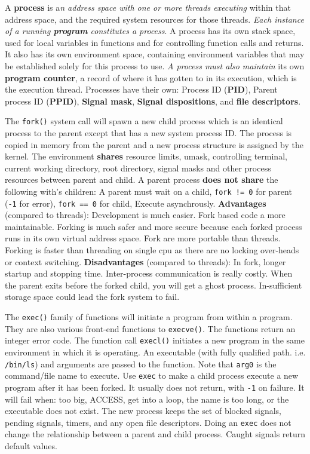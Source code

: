 \documentclass[10pt,landscape, a4paper]{article}
\begin{document}
\begin{multicols}{3}
A \textbf{process} is a\emph{n address space
with one or more threads executing} within that address space, 
and the required system resources for those threads. \emph{Each instance of a running 
\textbf{program} constitutes a process}. A process has its own stack space, used for local 
variables in functions and for controlling function calls and returns. 
It also has its own environment space, containing environment variables 
that may be established solely for this process to use. \emph{A process must 
also maintain} its own \textbf{program counter}, a record of where it has gotten 
to in its execution, which is the execution thread. Processes have their
own: Process ID (\textbf{PID}), Parent process ID (\textbf{PPID}), \textbf{Signal mask},\textbf{ Signal dispositions}, 
and \textbf{file descriptors}.


The \texttt{fork()} system call will spawn a new child process which is an 
identical process to the parent except that has a new system process ID. 
The process is copied in memory from the parent and a new process structure 
is assigned by the kernel. 
The environment \textbf{shares} resource limits, umask, controlling terminal, 
current working directory, root directory, signal masks and other 
process resources between parent and child.
A parent process \textbf{does not share} the following with's children:
A parent must wait on a child,
\texttt{fork != 0} for parent (\texttt{-1} for error),
\texttt{fork == 0} for child,
Execute asynchrously.
\textbf{Advantages} (compared to threads):
Development is much easier.
Fork based code a more maintainable.
Forking is much safer and more secure because each forked process runs in its own virtual address space.
Fork are more portable than threads.
Forking is faster than threading on single cpu as there are no locking over-heads or context switching.
\textbf{Disadvantages} (compared to threads):
In fork, longer startup and stopping time.
Inter-process communication is really costly.
When the parent exits before the forked child, you will get a ghost process.
In-sufficient storage space could lead the fork system to fail.



The \texttt{exec()} family of functions will initiate a program from within a program. 
They are also various front-end functions to \texttt{execve()}.
The functions return an integer error code.
The function call \texttt{execl()} initiates a new program in the same environment 
in which it is operating. An executable (with fully qualified path. i.e. \texttt{/bin/ls}) 
and arguments are passed to the function. Note that \texttt{arg0} is the command/file 
name to execute.
Use \texttt{exec} to make a child process execute a new program
after it has been forked. It usually does not return, with \texttt{-1}
on failure. It will fail when: too big, ACCESS, get into a loop, the name
is too long, or the executable does not exist. The new process keeps the
set of blocked signals, pending signals, timers, and any open file 
descriptors. Doing an \texttt{exec} does not change the relationship
between a parent and child process. Caught signals return default values.


\end{multicols}
\end{document}
